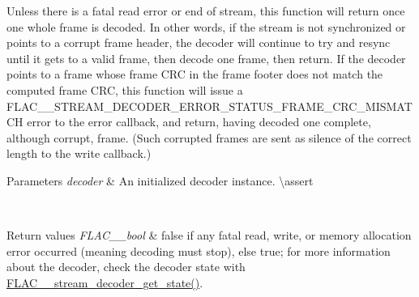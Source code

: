Unless there is a fatal read error or end of stream, this function will return once one whole frame is decoded. In other words, if the stream is not synchronized or points to a corrupt frame header, the decoder will continue to try and resync until it gets to a valid frame, then decode one frame, then return. If the decoder points to a frame whose frame C\+RC in the frame footer does not match the computed frame C\+RC, this function will issue a F\+L\+A\+C\+\_\+\+\_\+\+S\+T\+R\+E\+A\+M\+\_\+\+D\+E\+C\+O\+D\+E\+R\+\_\+\+E\+R\+R\+O\+R\+\_\+\+S\+T\+A\+T\+U\+S\+\_\+\+F\+R\+A\+M\+E\+\_\+\+C\+R\+C\+\_\+\+M\+I\+S\+M\+A\+T\+CH error to the error callback, and return, having decoded one complete, although corrupt, frame. (Such corrupted frames are sent as silence of the correct length to the write callback.)


\begin{DoxyParams}{Parameters}
{\em decoder} & An initialized decoder instance. \textbackslash{}assert 
\begin{DoxyCode}{1}
\end{DoxyCode}
 \\
\hline
\end{DoxyParams}

\begin{DoxyRetVals}{Return values}
{\em F\+L\+A\+C\+\_\+\+\_\+bool} & {\ttfamily false} if any fatal read, write, or memory allocation error occurred (meaning decoding must stop), else {\ttfamily true}; for more information about the decoder, check the decoder state with \mbox{\hyperlink{group__flac__stream__decoder_ga5899c204ad7183ec04e41855090c0635}{F\+L\+A\+C\+\_\+\+\_\+stream\+\_\+decoder\+\_\+get\+\_\+state()}}. \\
\hline
\end{DoxyRetVals}
\mbox{\label{group__flac__stream__decoder_ga5e07ca9bf67dabf2521737f63b2156e2}} 

